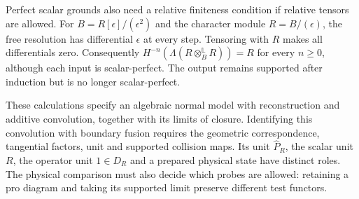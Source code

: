 Perfect scalar grounds also need a relative finiteness
condition if relative tensors are allowed. For
$B=R[\epsilon]/(\epsilon^2)$ and the character module
$R=B/(\epsilon)$, the free resolution has differential
$\epsilon$ at every step. Tensoring with $R$ makes all
differentials zero. Consequently
$H^{-n}(\Lambda(R\otimes_B^{\mathbb L}R))=R$ for every
$n\geq0$, although each input is scalar-perfect.
The output remains supported after induction but is no
longer scalar-perfect.

These calculations specify an algebraic normal model with
reconstruction and additive convolution, together with
its limits of closure. Identifying this convolution with
boundary fusion requires the geometric correspondence,
tangential factors, unit and supported collision maps.
Its unit $\widehat P_R$, the scalar unit $R$, the operator
unit $1\in D_R$ and a prepared physical state have distinct
roles. The physical comparison must also decide which
probes are allowed: retaining a pro diagram and taking
its supported limit preserve different test functors.
